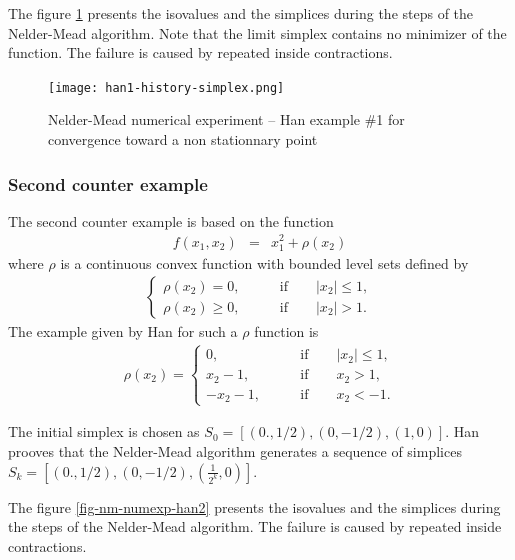 The figure \ref{fig-nm-numexp-han1} presents the isovalues and the 
simplices during the steps of the Nelder-Mead algorithm.
Note that the limit simplex contains no minimizer of the function.
The failure is caused by repeated inside contractions.

\begin{figure}
\begin{center}
\texttt{[image: han1-history-simplex.png]}
\end{center}
\caption{Nelder-Mead numerical experiment -- Han example \#1 for convergence toward
a non stationnary point}
\label{fig-nm-numexp-han1}
\end{figure}

\subsubsection{Second counter example}

The second counter example is based on the function 
\begin{eqnarray}
\label{han-function2}
f(x_1,x_2) &=& x_1^2 + \rho(x_2)
\end{eqnarray}
where $\rho$ is a continuous convex function with bounded level
sets defined by
\begin{eqnarray}
\label{han-function2-rho}
\left\{
\begin{array}{ll}
\rho(x_2) =0, &\qquad \textrm{if} \qquad |x_2|\leq 1, \\
\rho(x_2)\geq 0, &\qquad \textrm{if} \qquad |x_2|> 1.
\end{array}
\right.
\end{eqnarray}
The example given by Han for such a $\rho$ function is 
\begin{eqnarray}
\label{han-function2-rho2}
\rho(x_2) =
\left\{
\begin{array}{ll}
0, &\qquad \textrm{if} \qquad |x_2|\leq 1, \\
x_2 - 1, &\qquad \textrm{if} \qquad x_2> 1, \\
-x_2 - 1, &\qquad \textrm{if} \qquad x_2 < -1.
\end{array}
\right.
\end{eqnarray}

The initial simplex is chosen as $S_0 = [(0.,1/2),(0,-1/2),(1,0)]$.
Han prooves that the Nelder-Mead algorithm generates a sequence of simplices
$S_k = [(0.,1/2),(0,-1/2),(\frac{1}{2^k},0)]$.

The figure \ref{fig-nm-numexp-han2} presents the isovalues and the 
simplices during the steps of the Nelder-Mead algorithm.
The failure is caused by repeated inside contractions.

